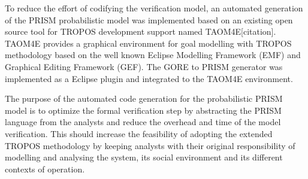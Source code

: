 To reduce the effort of codifying the verification model, an automated generation of the PRISM probabilistic model was implemented based on an existing open source tool for TROPOS development support named TAOM4E[citation]. TAOM4E provides a graphical environment for goal modelling with TROPOS methodology based on the well known Eclipse Modelling Framework (EMF) and Graphical Editing Framework (GEF). The GORE to PRISM generator was implemented as a Eclipse plugin and integrated to the TAOM4E environment. 

The purpose  of the automated code generation for the probabilistic PRISM model is to optimize the formal verification step by abstracting the PRISM language from the analysts and reduce the overhead and time of the model verification. This should increase the feasibility of adopting the extended TROPOS methodology by keeping analysts with their original responsibility of modelling and analysing the system, its social environment and its different contexts of operation.